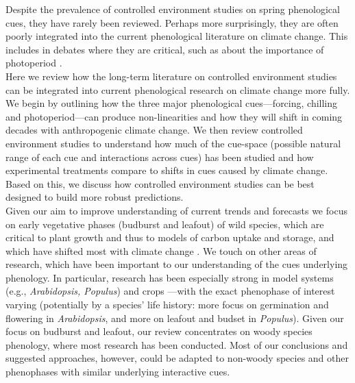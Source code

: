 \documentclass[11pt,letter]{article}
\begin{document}
Despite the prevalence of controlled environment studies on spring phenological cues, they have rarely been reviewed. Perhaps more surprisingly, they are often poorly integrated into the current phenological literature on climate change. This includes in debates where they are critical, such as about the importance of photoperiod \citep[e.g.,][]{fu2015,richardson2018}.\\

Here we review how the long-term literature on controlled environment studies can be integrated into current phenological research on climate change more fully. We begin by outlining how the three major phenological cues---forcing, chilling and photoperiod---can produce non-linearities and how they will shift in coming decades with anthropogenic climate change. We then review controlled environment studies to understand how much of the cue-space (possible natural range of each cue and interactions across cues) has been studied and how experimental treatments compare to shifts in cues caused by climate change. Based on this, we discuss how controlled environment studies can be best designed to build more robust predictions.\\ 

Given our aim to improve understanding of current trends and forecasts we focus on early vegetative phases (budburst and leafout) of wild species, which are critical to plant growth and thus to models of carbon uptake and storage, and which have shifted most with climate change \citep{Cleland:2007or,IPCC:2014sm}. We touch on other areas of research, which have been important to our understanding of the cues underlying phenology. In particular, research has been especially strong in model systems (e.g., \emph{Arabidopsis, Populus}) and crops \citep{cesaraccio2004}---with the exact phenophase of interest varying (potentially by a species' life history: more focus on germination and flowering in \emph{Arabidopsis}, and more on leafout and budset in \emph{Populus}).  Given our focus on budburst and leafout, our review concentrates on woody species phenology, where most research has been conducted. Most of our conclusions and suggested approaches, however, could be adapted to non-woody species and other phenophases with similar underlying interactive cues. \\
\end{document}
